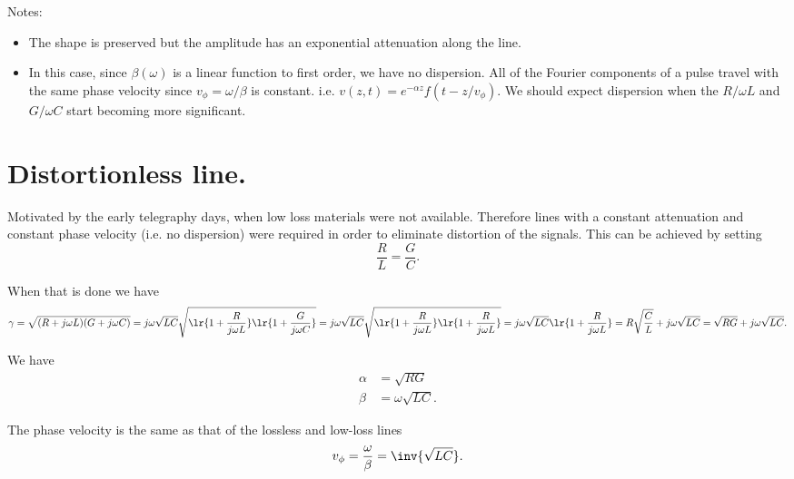 Notes:
\begin{itemize}
\item The shape is preserved but the amplitude has an exponential attenuation along the line.
\item In this case, since \( \beta(\omega) \) is a linear function to first order, we have no dispersion.  All of the Fourier components of a pulse travel with the same phase velocity since \( v_\phi = \omega/\beta \) is constant.  i.e.  \( v(z, t) = e^{-\alpha z} f( t - z/v_\phi ) \).  We should expect dispersion when the \( R/\omega L \) and \( G/\omega C \) start becoming more significant.
\end{itemize}
\section{Distortionless line.}
Motivated by the early telegraphy days, when low loss materials were not available.  Therefore lines with a constant attenuation and constant phase velocity (i.e. no dispersion) were required in order to eliminate distortion of the signals.  This can be achieved by setting
\begin{equation}\label{eqn:uwaves4TransmissionLines:760}
\frac{R}{L} = \frac{G}{C}.
\end{equation}

When that is done we have
\begin{dmath}\label{eqn:uwaves4TransmissionLines:780}
\gamma
= \sqrt{ (R + j \omega L) ( G + j \omega C ) }
= j \omega \sqrt{L C} \sqrt{
\lr{ 1 + \frac{R}{j \omega L} }
\lr{ 1 + \frac{G}{j \omega C} }
}
= j \omega \sqrt{L C} \sqrt{
\lr{ 1 + \frac{R}{j \omega L} }
\lr{ 1 + \frac{R}{j \omega L} }
}
= j \omega \sqrt{L C}
\lr{ 1 + \frac{R}{j \omega L} }
= R \sqrt{\frac{C}{L} }
+ j \omega \sqrt{L C}
= \sqrt{R G }
+ j \omega \sqrt{L C}.
\end{dmath}

We have
\begin{equation}\label{eqn:uwaves4TransmissionLines:800}
\begin{aligned}
\alpha &= \sqrt{R G } \\
\beta &= \omega \sqrt{L C}.
\end{aligned}
\end{equation}

The phase velocity is the same as that of the lossless and low-loss lines
\begin{equation}\label{eqn:uwaves4TransmissionLines:820}
v_\phi = \frac{\omega}{\beta} = \inv{\sqrt{L C}}.
\end{equation}
